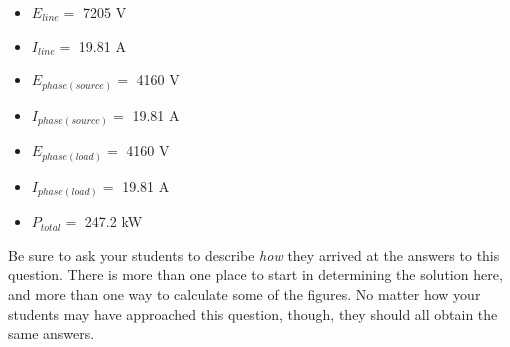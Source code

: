 
\begin{itemize}
\item{} $E_{line} =$ 7205 V
\item{} $I_{line} =$ 19.81 A
\item{} $E_{phase(source)} =$ 4160 V
\item{} $I_{phase(source)} =$ 19.81 A
\item{} $E_{phase(load)} =$ 4160 V
\item{} $I_{phase(load)} =$ 19.81 A
\item{} $P_{total} =$ 247.2 kW
\end{itemize}







Be sure to ask your students to describe {\it how} they arrived at the answers to this question.  There is more than one place to start in determining the solution here, and more than one way to calculate some of the figures.  No matter how your students may have approached this question, though, they should all obtain the same answers.





